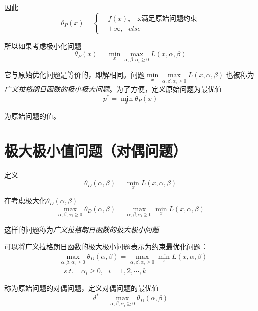 因此
\begin{equation}
    \theta_P(x)=
    \begin{cases}
        & f(x),\ \ \ \ \mbox{x满足原始问题约束}\\
        & +\infty,\ \ \ else
    \end{cases}
\end{equation}

所以如果考虑极小化问题
\begin{equation}
    \theta_P(x)=\min\limits_{x}\max\limits_{\alpha,\beta,\alpha_i\geqslant 0} L(x,\alpha,\beta)
\end{equation}

它与原始优化问题是等价的，即解相同。问题$\min\limits_{x}\max\limits_{\alpha,\beta,\alpha_i\geqslant 0} L(x,\alpha,\beta)$
也被称为\textsl{广义拉格朗日函数的极小极大问题}。为了方便，定义原始问题为最优值
\begin{equation}
    p^*=\min\limits_{x}\theta_P(x)
\end{equation}

为原始问题的值。

\section{极大极小值问题（对偶问题）}
定义
\begin{equation}
    \theta_{D}(\alpha,\beta)=\min\limits_{x}L(x,\alpha,\beta)
\end{equation}

在考虑极大化$\theta_D(\alpha,\beta)$
\begin{equation}
    \max\limits_{\alpha,\beta,\alpha_i\geqslant 0}\theta_{D}(\alpha,\beta)= \max\limits_{\alpha,\beta,\alpha_i\geqslant 0}\min\limits_{x}L(x,\alpha,\beta)
\end{equation}

这样的问题称为\textsl{广义拉格朗日函数的极大极小问题}

可以将广义拉格朗日函数的极大极小问题表示为约束最优化问题：
\begin{equation}
    \begin{aligned}
        & \max\limits_{\alpha,\beta,\alpha_i\geqslant 0}\theta_{D}(\alpha,\beta)= \max\limits_{\alpha,\beta,\alpha_i\geqslant 0}\min\limits_{x}L(x,\alpha,\beta)\\
        & \ \ \ s.t. \ \ \ \ \ \alpha_i\geqslant 0,\ \ \ i=1,2,\cdots,k
    \end{aligned}
\end{equation}

称为原始问题的对偶问题，定义对偶问题的最优值
\begin{equation}
    d^*=\max\limits_{\alpha,\beta,\alpha_i\geqslant 0} \theta_D(\alpha,\beta)
\end{equation}

